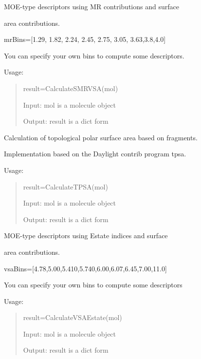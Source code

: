 \documentclass[letterpaper,10pt,english]{sphinxmanual}
\begin{document}

\begin{fulllineitems}
\label{reference/moe:moe.CalculateSMRVSA}
MOE-type descriptors using MR contributions and surface

area contributions.

mrBins={[}1.29, 1.82, 2.24, 2.45, 2.75, 3.05, 3.63,3.8,4.0{]}

You can specify your own bins to compute some descriptors.

Usage:
\begin{quote}

result=CalculateSMRVSA(mol)

Input: mol is a molecule object

Output: result is a dict form
\end{quote}

\end{fulllineitems}


\begin{fulllineitems}
\label{reference/moe:moe.CalculateTPSA}
Calculation of topological polar surface area based on fragments.

Implementation based on the Daylight contrib program tpsa.

Usage:
\begin{quote}

result=CalculateTPSA(mol)

Input: mol is a molecule object

Output: result is a dict form
\end{quote}

\end{fulllineitems}


\begin{fulllineitems}
\label{reference/moe:moe.CalculateVSAEstate}
MOE-type descriptors using Estate indices and surface

area contributions.

vsaBins={[}4.78,5.00,5.410,5.740,6.00,6.07,6.45,7.00,11.0{]}

You can specify your own bins to compute some descriptors

Usage:
\begin{quote}

result=CalculateVSAEstate(mol)

Input: mol is a molecule object

Output: result is a dict form
\end{quote}

\end{fulllineitems}
\end{document}
